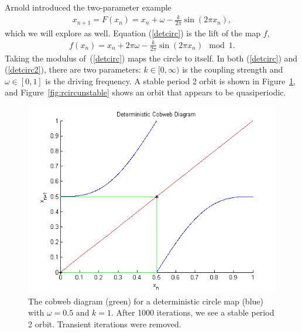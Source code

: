 Arnold introduced the two-parameter example
\begin{align}\label{detcirc}
x_{n+1}= F(x_n) =  x_n + \omega - \frac{k}{2\pi}\sin(2\pi x_n),
\end{align}
which we will explore as well. Equation (\ref{detcirc}) is the lift of the map
$f$,
\begin{align}\label{detcirc2}
f(x_n) = x_n + 2\pi \omega - \frac{k}{2\pi}\sin(2\pi x_n) \mod 1.
\end{align}
Taking the modulus of~(\ref{detcirc}) maps the circle
to itself. In both (\ref{detcirc}) and (\ref{detcirc2}), there are two parameters: $k \in [0,\infty)$
is the coupling strength and $\omega \in [0,1]$ is the driving
frequency. A stable period 2 orbit is shown in
Figure~\ref{fig:dcircstable}, and
Figure~\ref{fig:rcircunstable} shows an orbit that appears to be quasiperiodic.
\begin{figure}[!h]
\caption[Deterministic circle map, stable orbit]{The cobweb
  diagram (green) for a deterministic circle map (blue) with $\omega =
  0.5$ and $k=1$. After 1000 iterations, we see a stable period 2 orbit. Transient iterations were removed.}\label{fig:dcircstable}
	\begin{center}
		\includegraphics[scale=0.7]{figs/detcirc_cobweb_2.png}
	\end{center}
\end{figure}
